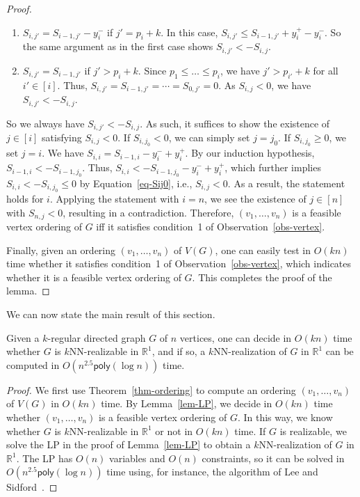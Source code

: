 \documentclass[english]{lipics-v2021}
\begin{document}
\begin{proof}
\begin{enumerate}
    By our induction hypothesis, $S_{i-1,j'} < -S_{i-1,j}$.
    Thus, $S_{i,j'} < -S_{i-1,j} + y_i^+ - y_i^-$.
    By Equation~\ref{eq-Sij0}, this implies $S_{i,j'} < -S_{i,j}$.
    \item $S_{i,j'} = S_{i-1,j'}-y_i^-$ if $j' = p_i+k$.
    In this case, $S_{i,j'} \leq S_{i-1,j'} + y_i^+ - y_i^-$.
    So the same argument as in the first case shows $S_{i,j'} < -S_{i,j}$.
    \item $S_{i,j'} = S_{i-1,j'}$ if $j' > p_i+k$.
    Since $p_1 \leq \dots \leq p_i$, we have $j' > p_{i'} + k$ for all $i' \in [i]$.
    Thus, $S_{i,j'} = S_{i-1,j'} = \cdots = S_{0,j'} = 0$.
    As $S_{i,j} < 0$, we have $S_{i,j'} < -S_{i,j}$.
\end{enumerate}
So we always have $S_{i,j'} < -S_{i,j}$.
As such, it suffices to show the existence of $j \in [i]$ satisfying $S_{i,j} < 0$.
If $S_{i,j_0} < 0$, we can simply set $j = j_0$.
If $S_{i,j_0} \geq 0$, we set $j = i$.
We have $S_{i,i} = S_{i-1,i} - y_i^- + y_i^+$.
By our induction hypothesis, $S_{i-1,i} < -S_{i-1,j_0}$.
Thus, $S_{i,i} < -S_{i-1,j_0} - y_i^- + y_i^+$, which further implies $S_{i,i} < - S_{i,j_0} \leq 0$ by Equation~\ref{eq-Sij0}, i.e., $S_{i,j} < 0$.
As a result, the statement holds for $i$.
Applying the statement with $i = n$, we see the existence of $j \in [n]$ with $S_{n,j} < 0$, resulting in a contradiction.
Therefore, $(v_1,\dots,v_n)$ is a feasible vertex ordering of $G$ iff it satisfies condition~1 of Observation~\ref{obs-vertex}.

Finally, given an ordering $(v_1,\dots,v_n)$ of $V(G)$, one can easily test in $O(kn)$ time whether it satisfies condition~1 of Observation~\ref{obs-vertex}, which indicates whether it is a feasible vertex ordering of $G$.
This completes the proof of the lemma.
\end{proof}
\noindent
We can now state the main result of this section.

\begin{theorem} \label{thm:final}
Given a $k$-regular directed graph $G$ of $n$ vertices, one can decide in $O(kn)$ time whether $G$ is $k$NN-realizable in $\mathbb{R}^1$, and if so, a $k$NN-realization of $G$ in $\mathbb{R}^1$ can be computed in $O(n^{2.5} \mathsf{poly}(\log n))$ time.
\end{theorem}

\begin{proof}
We first use Theorem~\ref{thm-ordering} to compute an ordering $(v_1,\dots,v_n)$ of $V(G)$ in $O(kn)$ time. By Lemma~\ref{lem-LP}, we decide in $O(kn)$ time whether $(v_1,\dots,v_n)$ is a feasible vertex ordering of $G$. In this way, we know whether $G$ is $k$NN-realizable in $\mathbb{R}^1$ or not in $O(kn)$ time. If $G$ is realizable, we solve the LP in the proof of Lemma~\ref{lem-LP} to obtain a $k$NN-realization of $G$ in $\mathbb{R}^1$. The LP has $O(n)$ variables and $O(n)$ constraints, so it can be solved in $O(n^{2.5} \mathsf{poly} (\log n))$ time using, for instance, the algorithm of Lee and Sidford~\cite{lee2015efficient}.
\end{proof}
\end{document}
